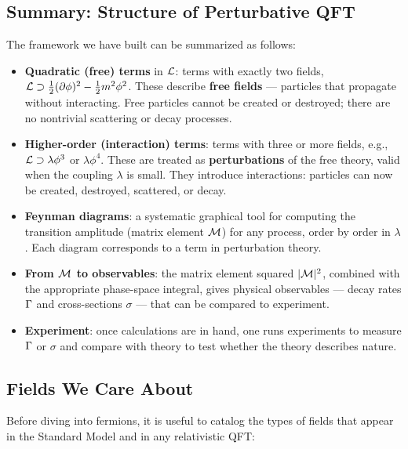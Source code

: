 \documentclass[../main.tex]{subfiles}
\begin{document}
\subsection*{Summary: Structure of Perturbative QFT}

The framework we have built can be summarized as follows:

\begin{itemize}
  \item \textbf{Quadratic (free) terms} in $\mathcal{L}$: terms with exactly two fields, $\mathcal{L} \supset \frac{1}{2}(\partial\phi)^2 - \frac{1}{2}m^2\phi^2$.  These describe \textbf{free fields} — particles that propagate without interacting.  Free particles cannot be created or destroyed; there are no nontrivial scattering or decay processes.

  \item \textbf{Higher-order (interaction) terms}: terms with three or more fields, e.g., $\mathcal{L} \supset \lambda\phi^3$ or $\lambda\phi^4$.  These are treated as \textbf{perturbations} of the free theory, valid when the coupling $\lambda$ is small.  They introduce interactions: particles can now be created, destroyed, scattered, or decay.

  \item \textbf{Feynman diagrams}: a systematic graphical tool for computing the transition amplitude (matrix element $\mathcal{M}$) for any process, order by order in $\lambda$.  Each diagram corresponds to a term in perturbation theory.

  \item \textbf{From $\mathcal{M}$ to observables}: the matrix element squared $|\mathcal{M}|^2$, combined with the appropriate phase-space integral, gives physical observables — decay rates $\Gamma$ and cross-sections $\sigma$ — that can be compared to experiment.

  \item \textbf{Experiment}: once calculations are in hand, one runs experiments to measure $\Gamma$ or $\sigma$ and compare with theory to test whether the theory describes nature.
\end{itemize}

\subsection*{Fields We Care About}

Before diving into fermions, it is useful to catalog the types of fields that appear in the Standard Model and in any relativistic QFT:
\end{document}
